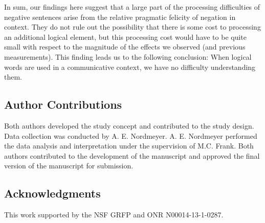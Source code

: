 \documentclass[man, noapacite]{apa2}
\begin{document}
In sum, our findings here suggest that a large part of the processing difficulties of negative sentences arise from the relative pragmatic felicity of negation in context. They do not rule out the possibility that there is some cost to processing an additional logical element, but this processing cost would have to be quite small with respect to the magnitude of the effects we observed (and previous measurements). This finding leads us to the following conclusion: When logical words are used in a communicative context, we have no difficulty understanding them.

\subsection{Author Contributions}
Both authors developed the study concept and contributed to the study design.  Data collection was conducted by A. E. Nordmeyer.  A. E. Nordmeyer performed the data analysis and interpretation under the supervision of M.C. Frank.  Both authors contributed to the development of the manuscript and approved the final version of the manuscript for submission.

\subsection{Acknowledgments}
This work supported by the NSF GRFP and ONR N00014-13-1-0287.




\end{document}
